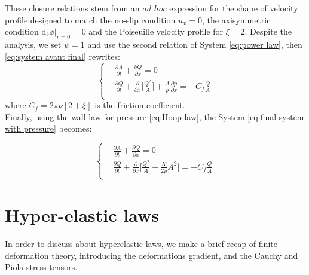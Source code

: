 \documentclass[12pt,a4paper]{article}
\numberwithin{equation}{section}
\begin{document}
These closure relations stem from an $ad$ $hoc$ expression for the shape of velocity profile designed to match the no-slip condition $u_x = 0$, the axisymmetric condition $\textrm{d}_{\bar{r}}\phi|_{\bar{r}= 0} = 0$ and the Poiseuille velocity profile for $\xi = 2$.
Despite the analysis, we set $\psi = 1$ and use the second relation of System \ref{eq:power law}, then \ref{eq:system avant final} rewrites:
\begin{equation} \label{eq:final system with pressure}
  \left\{
      \begin{aligned}
       & \frac{\partial A}{\partial t} + \frac{\partial Q}{\partial x} = 0\\
       &  \frac{\partial Q}{\partial t} +\frac{\partial}{\partial x}\Bigg[\frac{Q^2}{A}\Bigg]+\frac{A}{\rho}\frac{\partial p}{\partial x} = -C_f \frac{Q}{A} \\
      \end{aligned}
    \right.
\end{equation}
where $C_f = 2\pi\nu[2+\xi]$ is the friction coefficient.\\
Finally, using the wall law for pressure \ref{eq:Hoop law}, the System \ref{eq:final system with pressure} becomes:
\begin{mdframed}
\begin{equation} \label{eq:final dimensional system}
  \left\{
      \begin{aligned}
       & \frac{\partial A}{\partial t} + \frac{\partial Q}{\partial x} = 0\\
       &  \frac{\partial Q}{\partial t} +\frac{\partial}{\partial x}\Bigg[\frac{Q^2}{A}+\frac{K}{2\rho}A^2\Bigg] = -C_f \frac{Q}{A} \\
      \end{aligned}
    \right.
\end{equation}
\end{mdframed}


\newpage
\section{Hyper-elastic laws}
\label{Hyper-elastic laws}
In order to discuss about hyperelastic laws, we make a brief recap of finite deformation theory, introducing the deformations gradient, and the Cauchy and Piola stress tensors.\\
\end{document}
